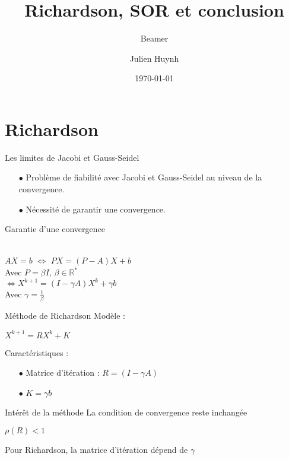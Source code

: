 \documentclass[10pt]{beamer}
\title{Richardson, SOR et conclusion}
\subtitle{Beamer}
\date{\today}
\author{Julien Huynh}
\institute{Cyb'Air}
\begin{document}
	{
	\usebackgroundtemplate{}
	\maketitle
}
\section{Richardson}
	\begin{frame}{Les limites de Jacobi et Gauss-Seidel}
	\begin{itemize}
		\item[$\bullet$]Problème de \alert{fiabilité} avec Jacobi et Gauss-Seidel au niveau de la \alert{convergence}.\pause
		
		\item [$\bullet$]Nécessité de garantir une convergence.
	\end{itemize}
	
	\pause
	
	
	
\end{frame}
\begin{frame}{Garantie d'une convergence}
	\begin{center}
		\LARGE {}\\
		\pause
		$AX=b$ \pause $\Leftrightarrow$ $PX=(P-A)X+b$\\ %
		Avec $P = \beta I$, $\beta \in \mathbb{R}^*$\\
		$\Leftrightarrow X^{k+1}=(I-\gamma A)X^k+\gamma b$\\
		Avec $\gamma=\frac{1}{\beta}$
	\end{center}

\end{frame}
\begin{frame}{Méthode de \alert{Richardson}}
Modèle : 
	\begin{center}
		$X^{k+1}=RX^k+K $\\
	\end{center}
\pause
Caractéristiques :
\begin{itemize}
	\item [$\bullet$] Matrice d'itération : $R = (I-\gamma A)$ \pause
	\item[$\bullet$] $K = \gamma b$
\end{itemize}
\end{frame}
\begin{frame}{Intérêt de la méthode}
La condition de convergence reste inchangée  \pause
\begin{center}
	$\rho(R)<1$ 
\end{center}

\pause
	Pour Richardson, la matrice d'itération dépend de $\gamma$ \pause
	\begin{center}
	\end{center}
\end{frame}
\end{document}
